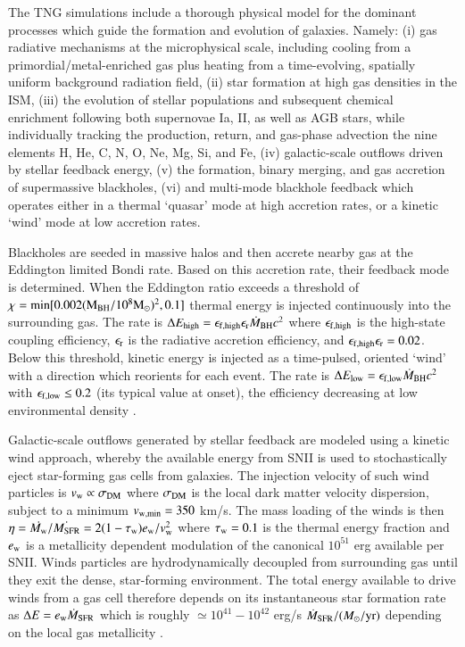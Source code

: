 \documentclass[useAMS,usenatbib]{mnras}
\begin{document}
The TNG simulations include a thorough physical model for the dominant processes which guide the formation and evolution of galaxies. Namely: (i) gas radiative mechanisms at the microphysical scale, including cooling from a primordial/metal-enriched gas plus heating from a time-evolving, spatially uniform background radiation field, (ii) star formation at high gas densities in the ISM, (iii) the evolution of stellar populations and subsequent chemical enrichment following both supernovae Ia, II, as well as AGB stars, while individually tracking the production, return, and gas-phase advection the nine elements H, He, C, N, O, Ne, Mg, Si, and Fe, (iv) galactic-scale outflows driven by stellar feedback energy, (v) the formation, binary merging, and gas accretion of supermassive blackholes, (vi) and multi-mode blackhole feedback which operates either in a thermal `quasar' mode at high accretion rates, or a kinetic `wind' mode at low accretion rates. 

Blackholes are seeded in massive halos and then accrete nearby gas at the Eddington limited Bondi rate. Based on this accretion rate, their feedback mode is determined. When the Eddington ratio exceeds a threshold of $\chi = \rm{min} [ 0.002 (M_{\rm BH}/10^8 \rm{M}_\odot)^2, 0.1]$ thermal energy is injected continuously into the surrounding gas. The rate is $\Delta E_{\rm high} = \epsilon_{\rm f,high} \epsilon_{\rm r} \dot{M}_{\rm BH} c^2$ where $\epsilon_{\rm f,high}$ is the high-state coupling efficiency, $\epsilon_{\rm r}$ is the radiative accretion efficiency, and $\epsilon_{\rm f,high} \epsilon_{\rm r} = 0.02$. Below this threshold, kinetic energy is injected as a time-pulsed, oriented `wind' with a direction which reorients for each event. The rate is $\Delta E_{\rm low} = \epsilon_{\rm f,low} \dot{M}_{\rm BH} c^2$ with $\epsilon_{\rm f,low} \le 0.2$ (its typical value at onset), the efficiency decreasing at low environmental density \citep[see][]{weinberger17}.

Galactic-scale outflows generated by stellar feedback are modeled using a kinetic wind approach, whereby the available energy from SNII is used to stochastically eject star-forming gas cells from galaxies. The injection velocity of such wind particles is $v_{\rm w} \propto \sigma_{\rm DM}$ where $\sigma_{\rm DM}$ is the local dark matter velocity dispersion, subject to a minimum $v_{\rm w,min} = 350$ km/s. The mass loading of the winds is then $\eta = \dot{M_{\rm w}} / \dot{M_{\rm SFR}} = 2 (1 - \tau_{\rm w}) e_{\rm w} / v_{\rm w}^2$ where $\tau_{\rm w} = 0.1$ is the thermal energy fraction and $e_{\rm w}$ is a metallicity dependent modulation of the canonical $10^{51}$ erg available per SNII. Winds particles are hydrodynamically decoupled from surrounding gas until they exit the dense, star-forming environment. The total energy available to drive winds from a gas cell therefore depends on its instantaneous star formation rate as $\Delta E = e_{\rm w} \dot{M}_{\rm SFR}$ which is roughly $\simeq 10^{41} - 10^{42}$ erg/s $\dot{M}_{\rm SFR} / (M_\odot / \rm{yr})$ depending on the local gas metallicity \citep[see][]{pillepich17a}.
\end{document}
